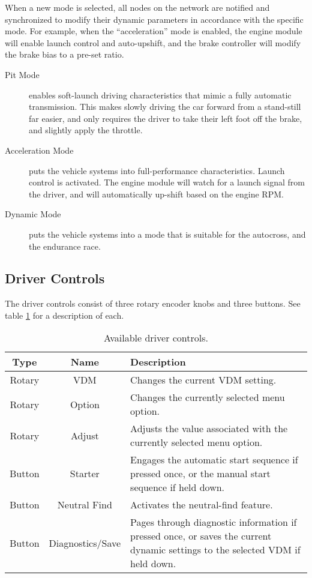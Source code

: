 When a new mode is selected, all nodes on the network are notified and synchronized to modify their dynamic parameters in accordance with the specific mode. For example, when the  {}``acceleration'' mode is enabled, the engine module will enable launch control and auto-upshift, and the brake controller will modify the brake bias to a pre-set ratio.

\begin{description}
  \item [{Pit Mode}] enables soft-launch driving characteristics that mimic a fully automatic transmission. This makes slowly driving the car forward from a stand-still far easier, and only requires the driver to take their left foot off the brake, and slightly apply the throttle.
  \item [{Acceleration Mode}] puts the vehicle systems into full-performance characteristics. Launch control is activated. The engine module will watch for a launch signal from the driver, and will automatically up-shift based on the engine RPM.
  \item [{Dynamic Mode}] puts the vehicle systems into a mode that is suitable for the autocross, and the endurance race.
\end{description}

\subsection{Driver Controls}

The driver controls consist of three rotary encoder knobs and three buttons. See table \ref{table:driver_controls} for a description of each.

\begin{table}[H]
	\caption{Available driver controls.\label{table:driver_controls}}
	\centering
	\begin{tabular}{|c|c|p{8 cm}|}
		\hline 
		Type & Name & Description \\
		\hline
		\hline 
		Rotary & VDM & Changes the current VDM setting. \\
		\hline 
		Rotary & Option & Changes the currently selected menu option. \\
		\hline
		Rotary & Adjust & Adjusts the value associated with the currently selected menu option. \\
		\hline
		Button & Starter & Engages the automatic start sequence if pressed once, or the manual start sequence if held down.\\
		\hline
		Button & Neutral Find & Activates the neutral-find feature. \\
		\hline
		Button & Diagnostics/Save & Pages through diagnostic information if pressed once, or saves the current dynamic settings to the selected VDM if held down.\\		
		\hline 		
	\end{tabular}
\end{table}

